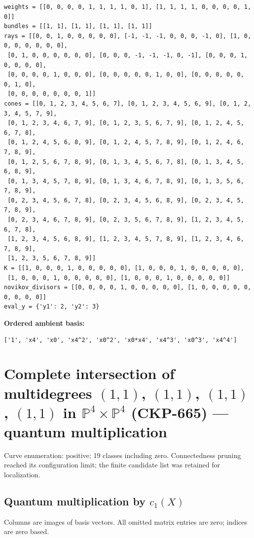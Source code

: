 \documentclass[10pt,a4paper]{article}
\begin{document}
\begin{lstlisting}
weights = [[0, 0, 0, 0, 1, 1, 1, 1, 0, 1], [1, 1, 1, 1, 0, 0, 0, 0, 1, 0]]
bundles = [[1, 1], [1, 1], [1, 1], [1, 1]]
rays = [[0, 0, 1, 0, 0, 0, 0, 0], [-1, -1, -1, 0, 0, 0, -1, 0], [1, 0, 0, 0, 0, 0, 0, 0],
 [0, 1, 0, 0, 0, 0, 0, 0], [0, 0, 0, -1, -1, -1, 0, -1], [0, 0, 0, 1, 0, 0, 0, 0],
 [0, 0, 0, 0, 1, 0, 0, 0], [0, 0, 0, 0, 0, 1, 0, 0], [0, 0, 0, 0, 0, 0, 1, 0],
 [0, 0, 0, 0, 0, 0, 0, 1]]
cones = [[0, 1, 2, 3, 4, 5, 6, 7], [0, 1, 2, 3, 4, 5, 6, 9], [0, 1, 2, 3, 4, 5, 7, 9],
 [0, 1, 2, 3, 4, 6, 7, 9], [0, 1, 2, 3, 5, 6, 7, 9], [0, 1, 2, 4, 5, 6, 7, 8],
 [0, 1, 2, 4, 5, 6, 8, 9], [0, 1, 2, 4, 5, 7, 8, 9], [0, 1, 2, 4, 6, 7, 8, 9],
 [0, 1, 2, 5, 6, 7, 8, 9], [0, 1, 3, 4, 5, 6, 7, 8], [0, 1, 3, 4, 5, 6, 8, 9],
 [0, 1, 3, 4, 5, 7, 8, 9], [0, 1, 3, 4, 6, 7, 8, 9], [0, 1, 3, 5, 6, 7, 8, 9],
 [0, 2, 3, 4, 5, 6, 7, 8], [0, 2, 3, 4, 5, 6, 8, 9], [0, 2, 3, 4, 5, 7, 8, 9],
 [0, 2, 3, 4, 6, 7, 8, 9], [0, 2, 3, 5, 6, 7, 8, 9], [1, 2, 3, 4, 5, 6, 7, 8],
 [1, 2, 3, 4, 5, 6, 8, 9], [1, 2, 3, 4, 5, 7, 8, 9], [1, 2, 3, 4, 6, 7, 8, 9],
 [1, 2, 3, 5, 6, 7, 8, 9]]
K = [[1, 0, 0, 0, 1, 0, 0, 0, 0, 0], [1, 0, 0, 0, 1, 0, 0, 0, 0, 0],
 [1, 0, 0, 0, 1, 0, 0, 0, 0, 0], [1, 0, 0, 0, 1, 0, 0, 0, 0, 0]]
novikov_divisors = [[0, 0, 0, 0, 1, 0, 0, 0, 0, 0], [1, 0, 0, 0, 0, 0, 0, 0, 0, 0]]
eval_y = {'y1': 2, 'y2': 3}
\end{lstlisting}

\textbf{Ordered ambient basis:}
\begin{lstlisting}
['1', 'x4', 'x0', 'x4^2', 'x0^2', 'x0*x4', 'x4^3', 'x0^3', 'x4^4']
\end{lstlisting}

\clearpage\section*{Complete intersection of multidegrees $(1,1)$, $(1,1)$, $(1,1)$, $(1,1)$ in $\mathbb P^{4}\times \mathbb P^{4}$ (CKP-665) --- quantum multiplication}

Curve enumeration: positive; 19 classes including zero.
Connectedness pruning reached its configuration limit; the finite candidate list was retained for localization.
\subsection*{Quantum multiplication by $c_1(X)$}
Columns are images of basis vectors. All omitted matrix entries are zero; indices are zero based.
\end{document}
